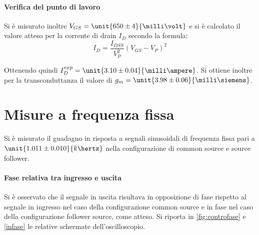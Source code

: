 \documentclass[10pt,a4paper]{article}
\begin{document}

\paragraph{Verifica del punto di lavoro} Si è misurato inoltre $V_{GS} = \unit{650 \pm 4}{\milli\volt}$ e si è calcolato il valore atteso per la corrente di drain $I_D$ secondo la formula:
\begin{equation*}
I_D = \frac{I_{DSS}}{V_P^2}(V_{GS} - V_P)^2
\end{equation*}

Ottenendo quindi $I_D^{exp} = \unit{3.10 \pm 0.04}{\milli\ampere}$. Si ottiene inoltre per la transconduttanza il valore di $g_m = \unit{3.98 \pm 0.06}{\milli\siemens}$.

\section{Misure a frequenza fissa}

Si è misurato il guadagno in risposta a segnali sinusoidali di frequenza fissa pari a $\unit{1.011 \pm 0.010}{k\hertz}$ nella configurazione di common source e source follower.

\paragraph{Fase relativa tra ingresso e uscita} Si è osservato che il segnale in uscita risultava in opposizione di fase rispetto al segnale in ingresso nel caso della configurazione common source e in fase nel caso della configurazione follower source, come atteso. Si riporta in \figurename{\ref{fig:controfase}} e \figurename{\ref{infase}} le relative schermate dell'oscilloscopio.
\end{document}
